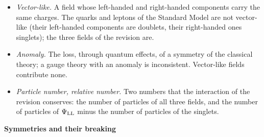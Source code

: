 \documentclass[
  10pt,
]{article}
\begin{document}
\begin{itemize}
  rule of Gell-Mann and Nishijima).
\item
  \emph{Vector-like.} A field whose left-handed and right-handed
  components carry the same charges. The quarks and leptons of the
  Standard Model are not vector-like (their left-handed components are
  doublets, their right-handed ones singlets); the three fields of the
  revision are.
\item
  \emph{Anomaly.} The loss, through quantum effects, of a symmetry of
  the classical theory; a gauge theory with an anomaly is inconsistent.
  Vector-like fields contribute none.
\item
  \emph{Particle number, relative number.} Two numbers that the
  interaction of the revision conserves: the number of particles of all
  three fields, and the number of particles of \(\Psi_{\rm LL}\) minus
  the number of particles of the singlets.
\end{itemize}

\textbf{Symmetries and their breaking}
\end{document}
